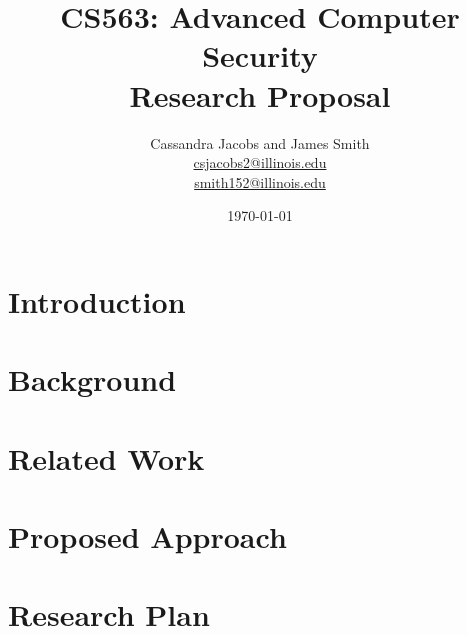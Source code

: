 \documentclass{article}
\title{\vspace{-3.0cm}CS563: Advanced Computer Security \\ Research Proposal}
\author{Cassandra Jacobs and James Smith\\
\href{mailto:csjacobs2@illinois.edu}{csjacobs2@illinois.edu } \\
\href{mailto:smith152@illinois.edu}{smith152@illinois.edu}}
\date{\today}
\begin{document}
\maketitle

\begin{multicols}{2}



\begin{abstract}
\blindtext
\end{abstract}


\section{Introduction}

\label{introduction}

\section{Background}

\label{background}

\section{Related Work}

\label{related-work}

\section{Proposed Approach}

\label{proposed-approach}

\section{Research Plan}

\label{proposed-approach}

\printbibliography

\end{multicols}
\end{document}
